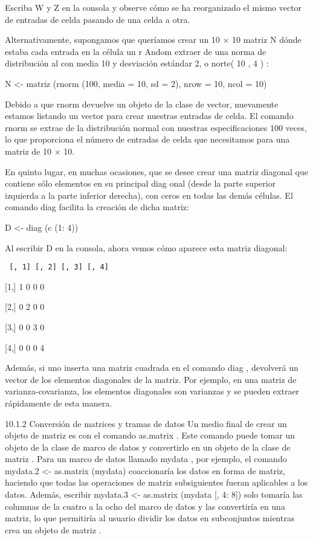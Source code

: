 \documentclass[
]{book}
\begin{document}
Escriba W y Z en la consola y observe cómo se ha reorganizado el mismo vector de entradas de celda pasando de una celda a otra.

Alternativamente, supongamos que queríamos crear un 10 × 10 matriz N dónde estaba cada entrada en la célula un r Andom extraer de una norma de distribución al con media 10 y desviación estándar 2, o norte( 10 , 4 ) :

N \textless- matriz (rnorm (100, media = 10, sd = 2), nrow = 10, ncol = 10)

Debido a que rnorm devuelve un objeto de la clase de vector, nuevamente estamos listando un vector para crear nuestras entradas de celda. El comando rnorm se extrae de la distribución normal con nuestras especificaciones 100 veces, lo que proporciona el número de entradas de celda que necesitamos para una matriz de 10 × 10.

En quinto lugar, en muchas ocasiones, que se desee crear una matriz diagonal que contiene sólo elementos en su principal diag onal (desde la parte superior izquierda a la parte inferior derecha), con ceros en todas las demás células. El comando diag facilita la creación de dicha matriz:

D \textless- diag (c (1: 4))

Al escribir D en la consola, ahora vemos cómo aparece esta matriz diagonal:

\begin{verbatim}
 [, 1] [, 2] [, 3] [, 4]
\end{verbatim}

{[}1,{]} 1 0 0 0

{[}2,{]} 0 2 0 0

{[}3,{]} 0 0 3 0

{[}4,{]} 0 0 0 4

Además, si uno inserta una matriz cuadrada en el comando diag , devolverá un vector de los elementos diagonales de la matriz. Por ejemplo, en una matriz de varianza-covarianza, los elementos diagonales son varianzas y se pueden extraer rápidamente de esta manera.

10.1.2 Conversión de matrices y tramas de datos
Un medio final de crear un objeto de matriz es con el comando as.matrix . Este comando puede tomar un objeto de la clase de marco de datos y convertirlo en un objeto de la clase de matriz . Para un marco de datos llamado mydata , por ejemplo, el comando mydata.2 \textless- as.matrix (mydata) coaccionaría los datos en forma de matriz, haciendo que todas las operaciones de matriz subsiguientes fueran aplicables a los datos. Además, escribir mydata.3 \textless- as.matrix (mydata {[}, 4: 8{]}) solo tomaría las columnas de la cuatro a la ocho del marco de datos y las convertiría en una matriz, lo que permitiría al usuario dividir los datos en subconjuntos mientras crea un objeto de matriz .
\end{document}
